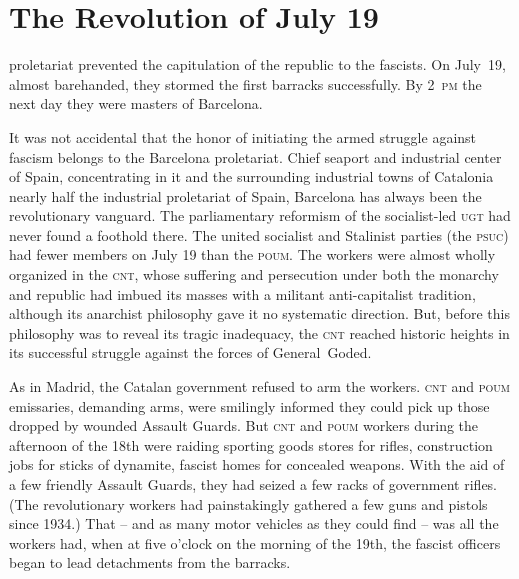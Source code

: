 \chapter{The Revolution of July 19}

 proletariat prevented the capitulation of the republic to the fascists. On July~19, almost barehanded, they stormed the first barracks successfully. By 2~\textsc{pm} the next day they were masters of Barcelona.

\indexCNT{}
It was not accidental that the honor of initiating the armed struggle against fascism belongs to the Barcelona proletariat. Chief seaport and industrial center of Spain, concentrating in it and the surrounding industrial towns of Catalonia nearly half the industrial proletariat of Spain, Barcelona has always been the revolutionary vanguard. The parliamentary reformism of the socialist-led \textsc{ugt} had never found a foothold there. The united socialist and Stalinist parties (the \textsc{psuc}) had fewer members on July 19 than the \textsc{poum}. The workers were almost wholly organized in the \textsc{cnt}, whose suffering and persecution under both the monarchy and republic had imbued its masses with a militant anti-capitalist tradition, although its anarchist philosophy gave it no systematic direction. But, before this philosophy was to reveal its tragic inadequacy, the \textsc{cnt} reached historic heights in its successful struggle against the forces of General~Goded.

As in Madrid, the Catalan government refused to arm the workers. \textsc{cnt} and \textsc{poum} emissaries, demanding arms, were smilingly informed they could pick up those dropped by wounded Assault Guards.
But \textsc{cnt} and \textsc{poum} workers during the afternoon of the 18th were raiding sporting goods stores for rifles, construction jobs for sticks of dynamite, fascist homes for concealed weapons. With the aid of a few friendly Assault Guards, they had seized a few racks of government rifles. (The revolutionary workers had painstakingly gathered a few guns and pistols since 1934.) That -- and as many motor vehicles as they could find -- was all the workers had, when at five o’clock on the morning of the 19th, the fascist officers began to lead detachments from the barracks.

